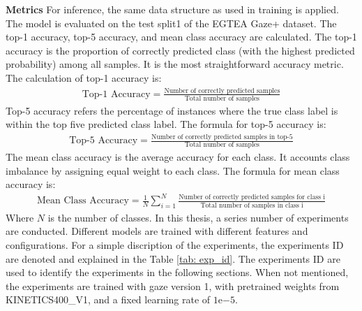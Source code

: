\textbf{Metrics} For inference, the same data structure as used in training is applied. The model is evaluated on the test split1 of the EGTEA Gaze+ dataset. The top-1 accuracy, top-5 accuracy, and mean class accuracy are calculated. The top-1 accuracy is the proportion of correctly predicted class (with the highest predicted probability) among all samples. It is the most straightforward accuracy metric. The calculation of top-1 accuracy is:
\begin{align}
    \text{Top-1 Accuracy} = \frac{\text{Number of correctly predicted samples}}{\text{Total number of samples}}
\end{align}
Top-5 accuracy refers the percentage of instances where the true class label is within the top five predicted class label. The formula for top-5 accuracy is:
\begin{align}
    \text{Top-5 Accuracy} = \frac{\text{Number of correctly predicted samples in top-5}}{\text{Total number of samples}}
\end{align}
The mean class accuracy is the average accuracy for each class. It accounts class imbalance by assigning equal weight to each class. The formula for mean class accuracy is:
\begin{align}
    \text{Mean Class Accuracy} = \frac{1}{N} \sum_{i=1}^{N} \frac{\text{Number of correctly predicted samples for class i}}{\text{Total number of samples in class i}}
\end{align}
Where $N$ is the number of classes. 
\clearpage
In this thesis, a series number of experiments are conducted. Different models are trained with different features and configurations. For a simple discription of the experiments, the experiments ID are denoted and explained in the Table \ref{tab: exp_id}. The experiments ID are used to identify the experiments in the following sections. When not mentioned, the experiments are trained with gaze version 1, with pretrained weights from KINETICS400\_V1, and a fixed learning rate of $1 \mathrm{e}{-5}$.
\vspace{5mm}
